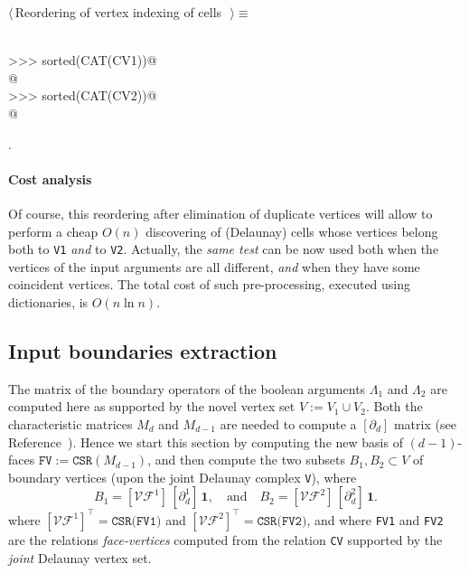 \documentclass[11pt,oneside]{article}	%
\begin{document}
\begin{flushleft} \small \label{scrap11}
$\langle\,$Reordering of vertex indexing of cells\nobreak\ {\footnotesize {}}$\,\rangle\equiv$
\vspace{-1ex}
\begin{list}{}{} \item
\mbox{}\verb@@\\
\mbox{}\verb@>>> sorted(CAT(CV1))@\\
\mbox{}\verb@[0, 1, 1, 2, 3, 4, 5, 5]@\\
\mbox{}\verb@>>> sorted(CAT(CV2))@\\
\mbox{}\verb@[3, 4, 5, 6, 7, 7, 8, 8, 9, 10, 11]@\\
\mbox{}\verb@@{\NWsep}
\end{list}
\vspace{-1ex}
\footnotesize\addtolength{\baselineskip}{-1ex}
\begin{list}{}{\setlength{\itemsep}{-\parsep}\setlength{\itemindent}{-\leftmargin}}
\item {\NWtxtMacroNoRef}.
\end{list}
\end{flushleft}
\paragraph{Cost analysis} 
Of course, this reordering after elimination of duplicate vertices will allow to perform a cheap $O(n)$ discovering of (Delaunay) cells whose vertices belong both to \texttt{V1} \emph{and} to \texttt{V2}. 
Actually, the \emph{same test} can be now used both when the vertices of the input arguments are all different, \emph{and} when they have some coincident vertices.
The total cost of such pre-processing, executed using dictionaries, is $O(n\ln n)$.

\subsection{Input boundaries extraction}

The matrix of the boundary operators of the boolean arguments $\Lambda_1$ and $\Lambda_2$ are computed here as supported by the novel vertex set $V := V_1 \cup V_2$. Both the characteristic matrices $M_d$ and $M_{d-1}$ are needed to compute a $[\partial_d]$ matrix (see Reference~\cite{Dicarlo:2014:TNL:2543138.2543294}). Hence we start this section by computing the new basis of $(d-1)$-faces $\texttt{FV} := \texttt{CSR}(M_{d-1})$, and then compute the two subsets $B_1,B_2 \subset V$ of boundary vertices (upon the joint Delaunay complex \texttt{V}), where
\[
B_1 = [\mathcal{VF}^1]\, [\partial_d^1]\,\mathbf{1},
\quad\mbox{and}\quad
B_2 = [\mathcal{VF}^2]\, [\partial_d^2]\,\mathbf{1}.
\]
where $[\mathcal{VF}^1]^\top = \texttt{CSR(FV1)}$ and $[\mathcal{VF}^2]^\top = \texttt{CSR(FV2)}$,
and where \texttt{FV1} and \texttt{FV2} are the relations \emph{face-vertices} computed from the relation \texttt{CV} supported by the \emph{joint} Delaunay vertex set. 
\end{document}
